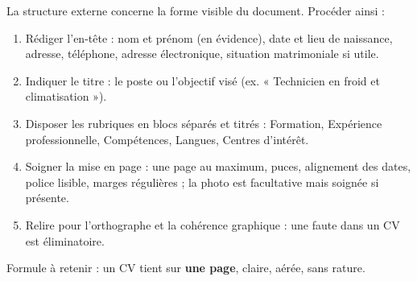 \documentclass[11pt]{article}
\newcommand{\cle}[1]{{\popxbold\color{popdark}#1}}
\begin{document}
\begin{methode}
La structure externe concerne la forme visible du document. Procéder ainsi :
\begin{enumerate}
\item Rédiger l'\cle{en-tête} : nom et prénom (en évidence), date et lieu de naissance, adresse, téléphone, adresse électronique, situation matrimoniale si utile.
\item Indiquer le \cle{titre} : le poste ou l'objectif visé (ex. « Technicien en froid et climatisation »).
\item Disposer les \cle{rubriques} en blocs séparés et titrés : Formation, Expérience professionnelle, Compétences, Langues, Centres d'intérêt.
\item Soigner la \cle{mise en page} : une page au maximum, puces, alignement des dates, police lisible, marges régulières ; la photo est facultative mais soignée si présente.
\item Relire pour l'\cle{orthographe} et la cohérence graphique : une faute dans un CV est éliminatoire.
\end{enumerate}
Formule à retenir : un CV tient sur \textbf{une page}, claire, aérée, sans rature.
\end{methode}
\end{document}
